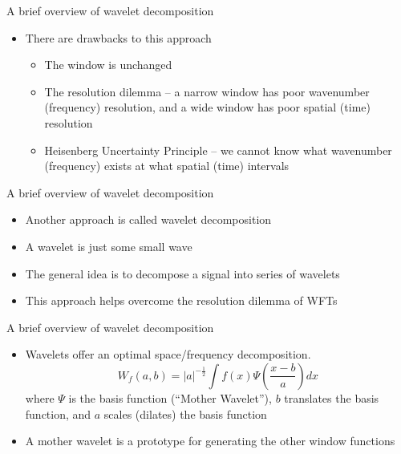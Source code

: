 
\begin{frame}{A brief overview of wavelet decomposition}

\begin{itemize}
	\item There are drawbacks to this approach
	\begin{itemize}
		\item The window is unchanged
		\item The resolution dilemma -- a narrow window has poor wavenumber (frequency) resolution, and a wide window has poor spatial (time) resolution
		\item Heisenberg Uncertainty Principle -- we cannot know what wavenumber (frequency) exists at what spatial (time) intervals
	\end{itemize}
\end{itemize}

\end{frame}


\begin{frame}{A brief overview of wavelet decomposition}

\begin{itemize}
	\item Another approach is called wavelet decomposition
	\item A wavelet is just some small wave
	\item The general idea is to decompose a signal into series of wavelets
	\item This approach helps overcome the resolution dilemma of WFTs
\end{itemize}
\end{frame}


\begin{frame}{A brief overview of wavelet decomposition}

\begin{itemize}
	\item Wavelets offer an optimal space/frequency decomposition.
	$$W_f(a,b) = |a|^{-\frac{1}{2}} \int f(x) \Psi \left(\frac{x-b}{a}\right)dx$$
	where $\Psi$ is the basis function (``Mother Wavelet''), $b$ translates the basis function, and $a$ scales (dilates) the basis function
	\item A mother wavelet is a prototype for generating the other window functions
\end{itemize}
\end{frame}


